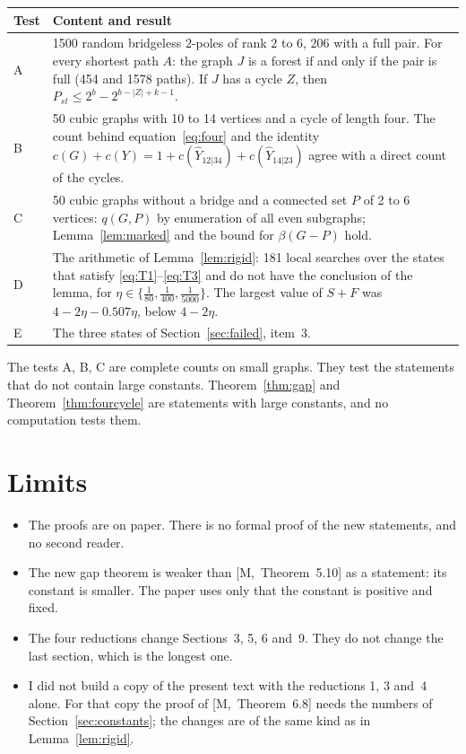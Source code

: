 \documentclass[11pt]{article}
\newcommand{\M}[1]{[M,~#1]}
\begin{document}
\begin{center}\small
\begin{tabular}{@{}p{1.2cm}p{13.3cm}@{}}
\toprule
\textsf{\textbf{Test}} & \textsf{\textbf{Content and result}}\\
\midrule
A & 1500 random bridgeless $2$-poles of rank $2$ to $6$, 206 with a full pair. For every shortest
path $A$: the graph $J$ is a forest if and only if the pair is full (454 and 1578 paths). If $J$
has a cycle $Z$, then $P_{st}\le2^{b}-2^{b-|Z|+k-1}$.\\
B & 50 cubic graphs with 10 to 14 vertices and a cycle of length four. The count behind
equation~\eqref{eq:four} and the identity $c(G)+c(Y)=1+c(\hat Y_{12|34})+c(\hat Y_{14|23})$ agree
with a direct count of the cycles.\\
C & 50 cubic graphs without a bridge and a connected set $P$ of 2 to 6 vertices: $q(G,P)$ by
enumeration of all even subgraphs; Lemma~\ref{lem:marked} and the bound for $\beta(G-P)$ hold.\\
D & The arithmetic of Lemma~\ref{lem:rigid}: 181 local searches over the states that satisfy
\eqref{eq:T1}--\eqref{eq:T3} and do not have the conclusion of the lemma, for
$\eta\in\{\frac1{80},\frac1{400},\frac1{5000}\}$. The largest value of $S+F$ was
$4-2\eta-0.507\eta$, below $4-2\eta$.\\
E & The three states of Section~\ref{sec:failed}, item~3.\\
\bottomrule
\end{tabular}
\end{center}

\noindent The tests A, B, C are complete counts on small graphs. They test the statements that
do not contain large constants. Theorem~\ref{thm:gap} and Theorem~\ref{thm:fourcycle} are
statements with large constants, and no computation tests them.

\section{Limits}\label{sec:limits}

\begin{itemize}[leftmargin=1.2em]
\item The proofs are on paper. There is no formal proof of the new statements, and no second
reader.
\item The new gap theorem is weaker than \M{Theorem~5.10} as a statement: its constant is
smaller. The paper uses only that the constant is positive and fixed.
\item The four reductions change Sections~3, 5, 6 and~9. They do not change the last section,
which is the longest one.
\item I did not build a copy of the present text with the reductions 1, 3 and~4 alone. For that
copy the proof of \M{Theorem~6.8} needs the numbers of Section~\ref{sec:constants}; the changes
are of the same kind as in Lemma~\ref{lem:rigid}.
\end{itemize}
\end{document}

